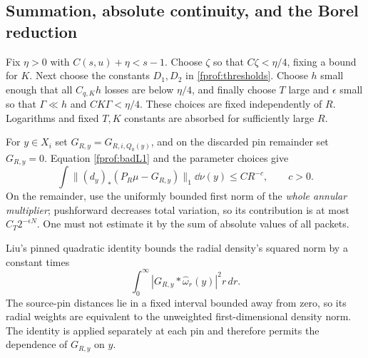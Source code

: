 

\subsection{Summation, absolute continuity, and the Borel reduction}

Fix \(\eta>0\) with \(C(s,u)+\eta<s-1\). Choose \(\zeta\) so that \(C\zeta<\eta/4\), fixing a bound for \(K\). Next choose the constants \(D_1,D_2\) in \eqref{fprof:thresholds}. Choose \(h\) small enough that all \(C_{q,K}h\) losses are below \(\eta/4\), and finally choose \(T\) large and \(\epsilon\) small so that \(\Gamma\ll h\) and \(CK\Gamma<\eta/4\). These choices are fixed independently of \(R\). Logarithms and fixed \(T,K\) constants are absorbed for sufficiently large \(R\).

For \(y\in X_i\) set \(G_{R,y}=G_{R,i,Q_0(y)}\), and on the discarded pin remainder set \(G_{R,y}=0\). Equation \eqref{fprof:badL1} and the parameter choices give
\begin{equation}\label{fprof:jointL1}
 \int\|(d_y)_*(P_R\mu-G_{R,y})\|_1\dd\nu(y)\leq C R^{-c},
 \qquad c>0.
\end{equation}
On the remainder, use the uniformly bounded first norm of the \emph{whole annular multiplier}; pushforward decreases total variation, so its contribution is at most \(C_T2^{-\epsilon N}\). One must not estimate it by the sum of absolute values of all packets.

Liu's pinned quadratic identity \cite{liuidentity} bounds the radial density's squared norm by a constant times
$$
 \int_0^\infty |G_{R,y}*\widehat\omega_r(y)|^2r\,dr.
$$
The source-pin distances lie in a fixed interval bounded away from zero, so its radial weights are equivalent to the unweighted first-dimensional density norm. The identity is applied separately at each pin and therefore permits the dependence of \(G_{R,y}\) on \(y\).

